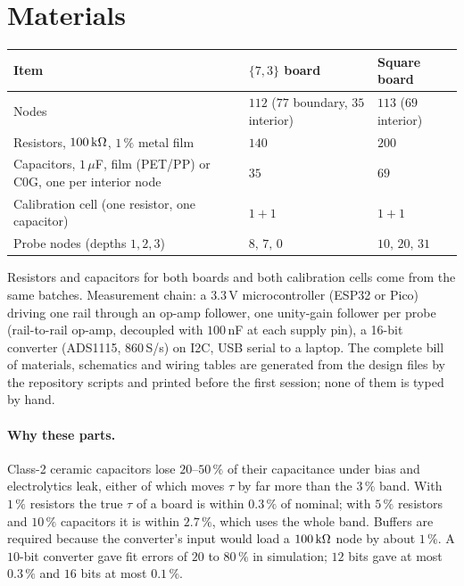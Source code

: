 \documentclass[11pt,a4paper]{article}
\begin{document}
\section{Materials}
\begin{center}\begin{tabular}{p{6.8cm}p{4.4cm}p{3.6cm}}\toprule
Item & $\{7,3\}$ board & Square board \\ \midrule
Nodes & $112$ ($77$ boundary, $35$ interior) & $113$ ($69$ interior) \\
Resistors, $100\,{\rm k}\Omega$, $1\,\%$ metal film & $140$ & $200$ \\
Capacitors, $1\,\mu$F, film (PET/PP) or C0G, one per interior node & $35$ & $69$ \\
Calibration cell (one resistor, one capacitor) & $1+1$ & $1+1$ \\
Probe nodes (depths $1,2,3$) & $8,\,7,\,0$ & $10,\,20,\,31$ \\ \bottomrule
\end{tabular}\end{center}
Resistors and capacitors for both boards and both calibration cells come from the same batches. Measurement chain: a $3.3$\,V microcontroller (ESP32 or Pico) driving one rail through an op-amp follower, one unity-gain follower per probe (rail-to-rail op-amp, decoupled with $100$\,nF at each supply pin),
a 16-bit converter (ADS1115, $860$\,S/s) on I2C, USB serial to a laptop. The complete bill of materials, schematics and wiring tables are generated from the design files by the repository scripts and printed before the first session; none of them is typed by hand.
\paragraph{Why these parts.} Class-2 ceramic capacitors lose $20$--$50\,\%$ of their capacitance under bias and electrolytics leak, either of which moves $\tau$ by far more than the $3\,\%$ band. With $1\,\%$ resistors the true $\tau$ of a board is within $0.3\,\%$ of nominal; with $5\,\%$ resistors and $10\,\%$ capacitors it is within $2.7\,\%$, which uses the whole band.
Buffers are required because the converter's input would load a $100\,{\rm k}\Omega$ node by about $1\,\%$. A $10$-bit converter gave fit errors of $20$ to $80\,\%$ in simulation; $12$ bits gave at most $0.3\,\%$ and $16$ bits at most $0.1\,\%$.
\end{document}
